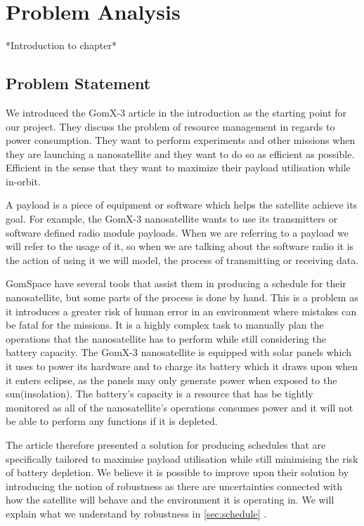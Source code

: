 \chapter{Problem Analysis} \label{cha:problem}
*Introduction to chapter*

\section{Problem Statement}
We introduced the GomX-3 article in the introduction as the starting point for our project. They discuss the problem of resource management in regards to power consumption. They want to perform experiments and other missions when they are launching a nanosatellite and they want to do so as efficient as possible. Efficient in the sense that they want to maximize their payload utilisation while in-orbit. 

A payload is a piece of equipment or software which helps the satellite achieve its goal. For example, the GomX-3 nanosatellite wants to use its transmitters or software defined radio module payloads. When we are referring to a payload we will refer to the usage of it, so when we are talking about the software radio it is the action of using it we will model, the process of transmitting or receiving data. %

GomSpace have several tools that assist them in producing a schedule for their nanosatellite, but some parts of the process is done by hand. This is a problem as it introduces a greater risk of human error in an environment where mistakes can be fatal for the missions. It is a highly complex task to manually plan the operations that the nanosatellite has to perform while still considering the battery capacity. The GomX-3 nanosatellite is equipped with solar panels which it uses to power its hardware and to charge its battery which it draws upon when it enters eclipse, as the panels may only generate power when exposed to the sun(insolation). The battery's capacity is a resource that has be tightly monitored as all of the nanosatellite's operations consumes power and it will not be able to perform any functions if it is depleted.\cite{gomx3}

The article therefore presented a solution for producing schedules that are specifically tailored to maximise payload utilisation while still minimising the risk of battery depletion. We believe it is possible to improve upon their solution by introducing the 
notion of robustness as there are uncertainties connected with how the satellite will behave and the environment it is operating in. We will explain what we understand by robustness in \cref{sec:schedule} .


